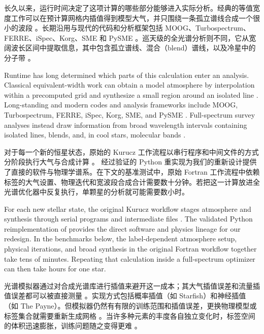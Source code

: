 长久以来，运行时间决定了这项计算的哪些部分能够进入实际分析。经典的等值宽度工作可以在预计算网格内插值得到模型大气，并只围绕一条孤立谱线合成一个很小的波段 \citep{CastelliKurucz2003}。长期沿用与现代的代码和分析框架包括 MOOG、Turbospectrum、FERRE、iSpec、Korg、SME 和 PySME \citep{ValentiPiskunov1996,Plez2012,MOOG2012,BlancoCuaresma2014,PiskunovValenti2017,FERRE2023,Wehrhahn2023,Wheeler2023}。巡天级的全光谱分析则不同，它从宽阔波长区间中提取信息，其中包含孤立谱线、混合（blend）谱线，以及冷星中的分子带 \citep{ValentiFischer2005,Ting2017Prospects}。

\begin{EN}
Runtime has long determined which parts of this calculation enter an analysis.
Classical equivalent-width work can obtain a model atmosphere by interpolation
within a precomputed grid and synthesize a small region around an isolated
line \citep{CastelliKurucz2003}. Long-standing and modern codes and analysis
frameworks include MOOG, Turbospectrum, FERRE, iSpec, Korg, SME, and PySME
\citep{ValentiPiskunov1996,Plez2012,MOOG2012,BlancoCuaresma2014,
PiskunovValenti2017,FERRE2023,Wehrhahn2023,Wheeler2023}. Full-spectrum survey
analyses instead draw information from broad wavelength intervals
containing isolated lines, blends, and, in cool stars, molecular bands
\citep{ValentiFischer2005,Ting2017Prospects}.
\end{EN}

对于每一个新的恒星状态，原始的 Kurucz 工作流程以串行程序和中间文件的方式分阶段执行大气与合成计算 \citep{Kurucz2005}。\citet{KimTing2026} 经过验证的 Python 重实现为我们的重新设计提供了直接的软件与物理学谱系。在下文的基准测试中，原始 Fortran 工作流程中依赖标签的大气设置、物理迭代和宽波段合成合计需要数十分钟。若把这一计算放进全光谱优化器中反复执行，单颗星的分析就可能需要数小时。

\begin{EN}
For each new stellar state, the
original Kurucz workflow stages atmosphere and synthesis through serial
programs and intermediate files \citep{Kurucz2005}. The validated Python
reimplementation of \citet{KimTing2026} provides the direct
software and physics lineage for our redesign. In the benchmarks below, the
label-dependent atmosphere setup, physical iterations, and broad synthesis in
the original Fortran workflow together take tens of minutes. Repeating that
calculation inside a full-spectrum optimizer can then take hours for one star.
\end{EN}

光谱模拟器通过对合成光谱库进行插值来避开这一成本；其大气插值误差和流量插值误差都可以被直接测量 \citep{MeszarosAllendePrieto2013}。实现方式包括概率插值（如 Starfish）和神经插值（如 The Payne）\citep{Czekala2015,Ting2019}。但模拟器仍然有有限的训练范围和插值误差，更换物理模型或标签集合就需要重新生成网格 \citep{Rozanski2025a}。当许多种元素的丰度各自独立变化时，标签空间的体积迅速膨胀，训练问题随之变得更难 \citep{Casey2016,Ting2016}。


